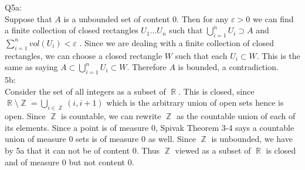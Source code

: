 \documentclass[letterpaper]{article}
\DeclareMathOperator{\R}{\mathbb{R}}
\DeclareMathOperator{\Z}{\mathbb{Z}}
\begin{document}
Q5a:\\
Suppose that $A$ is a unbounded set of content 0. Then for any $\varepsilon>0$ we can find a finite collection of closed rectangles $U_1\dots U_n$ such that $\bigcup_{i=1}^n U_i \supset A$ and $\sum_{i=1}^n vol(U_i) < \varepsilon$
. Since we are dealing with a finite collection of closed rectangles, we can choose a closed rectangle $W$ such that each $U_i \subset W$. This is the same as saying $A \subset \bigcup_{i=1}^n U_i \subset W$. Therefore $A$ is bounded, a contradiction. 
\\ 5b: \\
Consider the set of all integers as a subset of $\R$. This is closed, since $\R \setminus \Z = \bigcup_{i\in \Z} (i, i+1)$ which is the arbitrary union of open sets hence is open. Since $\Z$ is countable, we can rewrite $\Z$ as the countable union of each of its elements. Since a point is of measure 0, Spivak Theorem 3-4 says a countable union of measure 0 sets is of measure 0 as well. Since $\Z$ is unbounded, we have by 5a that it can not be of content 0. Thus $\Z$ viewed as a subset of $\R$ is closed and of measure 0 but not content 0. 
\end{document}
